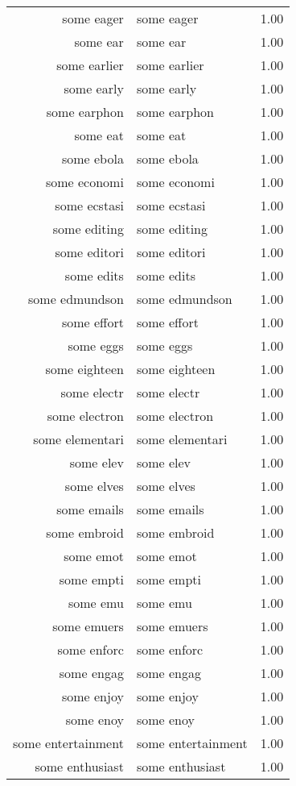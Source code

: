 \begin{table}[ht]
\begin{tabular}{rlr}
  some eager & some eager & 1.00 \\ 
  some ear & some ear & 1.00 \\ 
  some earlier & some earlier & 1.00 \\ 
  some early & some early & 1.00 \\ 
  some earphon & some earphon & 1.00 \\ 
  some eat & some eat & 1.00 \\ 
  some ebola & some ebola & 1.00 \\ 
  some economi & some economi & 1.00 \\ 
  some ecstasi & some ecstasi & 1.00 \\ 
  some editing & some editing & 1.00 \\ 
  some editori & some editori & 1.00 \\ 
  some edits & some edits & 1.00 \\ 
  some edmundson & some edmundson & 1.00 \\ 
  some effort & some effort & 1.00 \\ 
  some eggs & some eggs & 1.00 \\ 
  some eighteen & some eighteen & 1.00 \\ 
  some electr & some electr & 1.00 \\ 
  some electron & some electron & 1.00 \\ 
  some elementari & some elementari & 1.00 \\ 
  some elev & some elev & 1.00 \\ 
  some elves & some elves & 1.00 \\ 
  some emails & some emails & 1.00 \\ 
  some embroid & some embroid & 1.00 \\ 
  some emot & some emot & 1.00 \\ 
  some empti & some empti & 1.00 \\ 
  some emu & some emu & 1.00 \\ 
  some emuers & some emuers & 1.00 \\ 
  some enforc & some enforc & 1.00 \\ 
  some engag & some engag & 1.00 \\ 
  some enjoy & some enjoy & 1.00 \\ 
  some enoy & some enoy & 1.00 \\ 
  some entertainment & some entertainment & 1.00 \\ 
  some enthusiast & some enthusiast & 1.00 \\ 

\end{tabular}
\end{table}
